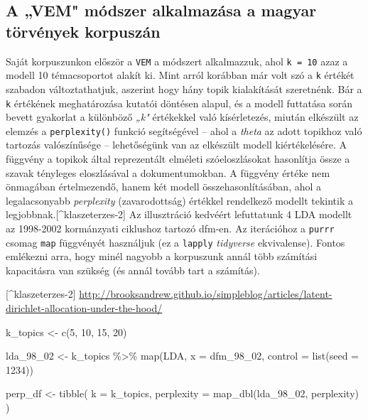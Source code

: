 \documentclass[
]{book}
\newenvironment{Shaded}{\begin{snugshade}}{\end{snugshade}}
\newcommand{\AttributeTok}[1]{\textcolor[rgb]{0.77,0.63,0.00}{#1}}
\newcommand{\DecValTok}[1]{\textcolor[rgb]{0.00,0.00,0.81}{#1}}
\newcommand{\FunctionTok}[1]{\textcolor[rgb]{0.00,0.00,0.00}{#1}}
\newcommand{\NormalTok}[1]{#1}
\newcommand{\OtherTok}[1]{\textcolor[rgb]{0.56,0.35,0.01}{#1}}
\newcommand{\SpecialCharTok}[1]{\textcolor[rgb]{0.00,0.00,0.00}{#1}}
\begin{document}
\hypertarget{a-vem-muxf3dszer-alkalmazuxe1sa-a-magyar-tuxf6rvuxe9nyek-korpuszuxe1n}{%
\subsection{A „VEM" módszer alkalmazása a magyar törvények
korpuszán}\label{a-vem-muxf3dszer-alkalmazuxe1sa-a-magyar-tuxf6rvuxe9nyek-korpuszuxe1n}}

Saját korpuszunkon először a \texttt{VEM} a módszert alkalmazzuk, ahol
\texttt{k\ =\ 10} azaz a modell 10 témacsoportot alakít ki. Mint arról
korábban már volt szó a \texttt{k} értékét szabadon változtathatjuk,
aszerint hogy hány topik kialakítását szeretnénk. Bár a \texttt{k}
értékének meghatározása kutatói döntésen alapul, és a modell futtatása
során bevett gyakorlat a különböző \emph{„k"} értékekkel való
kísérletezés, miután elkészült az elemzés a \texttt{perplexity()}
funkció segítségével -- ahol a \emph{theta} az adott topikhoz való
tartozás valószínűsége -- lehetőségünk van az elkészült modell
kiértékelésére. A függvény a topikok által reprezentált elméleti
szóeloszlásokat hasonlítja össze a szavak tényleges eloszlásával a
dokumentumokban. A függvény értéke nem önmagában értelmezendő, hanem két
modell összehasonlításában, ahol a legalacsonyabb \emph{perplexity}
(zavarodottság) értékkel rendelkező modellt tekintik a
legjobbnak.{[}\^{}klaszeterzes-2{]} Az illusztráció kedvéért lefuttatunk
4 LDA modellt az 1998-2002 kormánzyati ciklushoz tartozó dfm-en. Az
iterációhoz a \texttt{purrr} csomag \texttt{map} függvényét használjuk
(ez a \texttt{lapply} \emph{tidyverse} ekvivalense). Fontos emlékezni
arra, hogy minél nagyobb a korpuszunk annál több számítási kapacitásra
van szükség (és annál tovább tart a számítás).

{[}\^{}klaszeterzes-2{]}
\url{http://brooksandrew.github.io/simpleblog/articles/latent-dirichlet-allocation-under-the-hood/}

\begin{Shaded}
\begin{Highlighting}[]
\NormalTok{k\_topics }\OtherTok{\textless{}{-}} \FunctionTok{c}\NormalTok{(}\DecValTok{5}\NormalTok{, }\DecValTok{10}\NormalTok{, }\DecValTok{15}\NormalTok{, }\DecValTok{20}\NormalTok{)}

\NormalTok{lda\_98\_02 }\OtherTok{\textless{}{-}}\NormalTok{ k\_topics }\SpecialCharTok{\%\textgreater{}\%}
  \FunctionTok{map}\NormalTok{(LDA, }\AttributeTok{x =}\NormalTok{ dfm\_98\_02, }\AttributeTok{control =} \FunctionTok{list}\NormalTok{(}\AttributeTok{seed =} \DecValTok{1234}\NormalTok{))}


\NormalTok{perp\_df }\OtherTok{\textless{}{-}} \FunctionTok{tibble}\NormalTok{(}
  \AttributeTok{k =}\NormalTok{ k\_topics,}
  \AttributeTok{perplexity =} \FunctionTok{map\_dbl}\NormalTok{(lda\_98\_02, perplexity)}
\NormalTok{)}
\end{Highlighting}
\end{Shaded}
\end{document}

